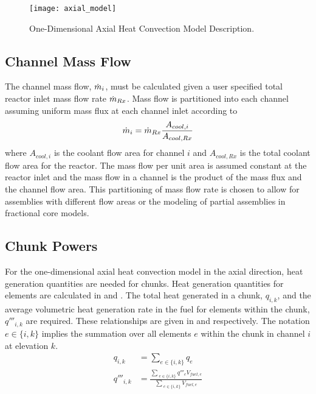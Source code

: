     \begin{figure}
      \centering
      \texttt{[image: axial\_model]}
      \caption{One-Dimensional Axial Heat Convection Model Description.}
      \label{fig:axial_model}
    \end{figure}

  \subsection{Channel Mass Flow}
    The channel mass flow, $\dot{m}_i$, must be calculated given a user 
    specified total reactor inlet mass flow rate $\dot{m}_{Rx}$. Mass flow is 
    partitioned into each channel assuming uniform mass flux at each channel
    inlet according to 
    \begin{equation}
      \label{eq:mass_flow_split}
      \dot{m}_i = \dot{m}_{Rx} \frac{A_{cool,i}}{A_{cool,Rx}}
    \end{equation}
    where $A_{cool,i}$ is the coolant flow area for channel $i$ and
    $A_{cool,Rx}$ is the total coolant flow area for the reactor. The mass flow
    per unit area is assumed constant at the reactor inlet and the mass flow in
    a channel is the product of the mass flux and the channel flow area. This
    partitioning of mass flow rate is chosen to allow for assemblies with
    different flow areas or the modeling of partial assemblies in fractional
    core models.

  \subsection{Chunk Powers}
    For the one-dimensional axial heat convection model in the axial direction,
    heat generation quantities are needed for chunks. Heat generation quantities
    for elements are calculated in  and
    .  The total heat generated in a chunk, $q_{i,k}$,
    and the average volumetric heat generation rate in the fuel for elements
    within the chunk, $q'''_{i,k}$ are required.  These relationships are given
    in  and  respectively. The
    notation $e \in \{i,k\}$ implies the summation over all elements $e$ within
    the chunk in channel $i$ at elevation $k$.
    \begin{align}
      \label{eq:chunkpwr}
      q_{i,k} &= \sum_{e \in \{i,k\}} q_e \\
      \label{eq:chunkqppp_fuel}
      q'''_{i,k} &= \frac{\sum_{\; e \in \{i,k\}} q'''_e V_{fuel,e}}
        {\sum_{\; e \in \{i,k\}} V_{fuel,e}}
    \end{align}
  
